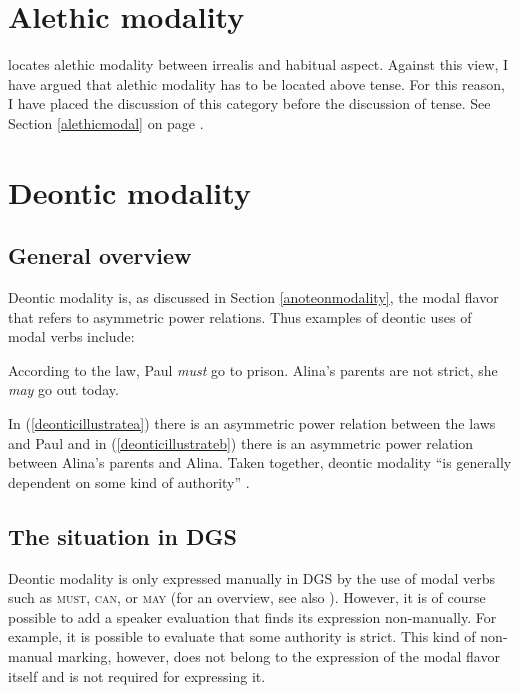 \section{Alethic modality}
\citet{cinque1999adverbs} locates alethic modality between irrealis and habitual aspect. Against this view, I have argued that alethic modality has to be located above tense. For this reason, I have placed the discussion of this category before the discussion of tense. See Section \ref{alethicmodal} on page \pageref{alethicmodal}.

\section{Deontic modality}\label{deonticmodalsection}


\subsection{General overview}

Deontic modality is, as discussed in Section \ref{anoteonmodality}, the modal flavor that refers to asymmetric power relations. Thus examples of deontic uses of modal verbs include:

\begin{exe}
\ex\label{deonticillustrate}\begin{xlist}
\ex According to the law, Paul \textit{must} go to prison.\label{deonticillustratea}
\ex Alina's parents are not strict, she \textit{may} go out today.\label{deonticillustrateb}
\end{xlist}
\end{exe} 

\noindent In (\ref{deonticillustratea}) there is an asymmetric power relation between the laws and Paul and in (\ref{deonticillustrateb}) there is an asymmetric power relation between Alina's parents and Alina. Taken together, deontic modality ``is generally dependent on some kind of authority'' \citep[70]{palmer2001mood}.

\subsection{The situation in DGS}
Deontic modality is only expressed manually in DGS by the use of modal verbs such as \textsc{must}, \textsc{can}, or \textsc{may} (for an overview, see also \citealt{pfauquer2007syntaxofnegationandmodals}). However, it is of course possible to add a speaker evaluation that finds its expression non-manually. For example, it is possible to evaluate that some authority is strict. This kind of non-manual marking, however, does not belong to the expression of the modal flavor itself and is not required for expressing it.

